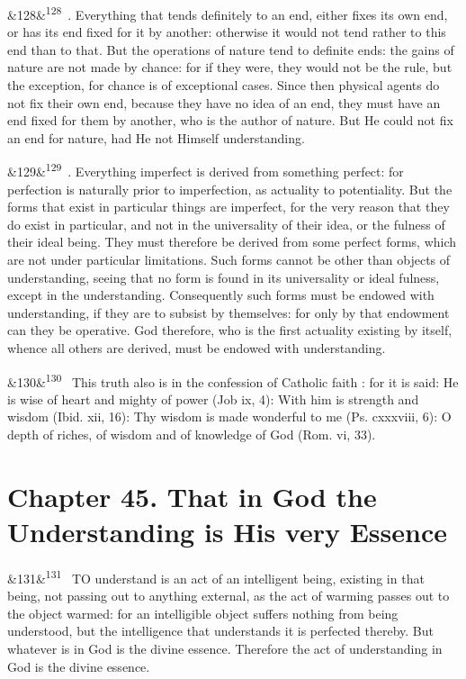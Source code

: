 \documentclass[12pt]{article}
\newcommand{\para}[1][]{\par\noindent\ifx&#1&\else\textsuperscript{\footnotesize #1}~\fi}
\begin{document}
\para[128] 6. Everything that tends definitely to an end, either fixes its own end, or has its end fixed for it by another: otherwise it would not tend rather to this end than to that. But the operations of nature tend to definite ends: the gains of nature are not made by chance: for if they were, they would not be the rule, but the exception, for chance is of exceptional cases. Since then physical agents do not fix their own end, because they have no idea of an end, they must have an end fixed for them by another, who is the author of nature. But He could not fix an end for nature, had He not Himself understanding.

\para[129] 7. Everything imperfect is derived from something perfect: for perfection is naturally prior to imperfection, as actuality to potentiality. But the forms that exist in particular things are imperfect, for the very reason that they do exist in particular, and not in the universality of their idea, or the fulness of their ideal being. They must therefore be derived from some perfect forms, which are not under particular limitations. Such forms cannot be other than objects of understanding, seeing that no form is found in its universality or ideal fulness, except in the understanding. Consequently such forms must be endowed with understanding, if they are to subsist by themselves: for only by that endowment can they be operative. God therefore, who is the first actuality existing by itself, whence all others are derived, must be endowed with understanding.

\para[130] This truth also is in the confession of Catholic faith : for it is said: He is wise of heart and mighty of power (Job ix, 4): With him is strength and wisdom (Ibid. xii, 16): Thy wisdom is made wonderful to me (Ps. cxxxviii, 6): O depth of riches, of wisdom and of knowledge of God (Rom. vi, 33).

\section*{Chapter 45. That in God the Understanding is His very Essence}

\para[131] TO understand is an act of an intelligent being, existing in that being, not passing out to anything external, as the act of warming passes out to the object warmed: for an intelligible object suffers nothing from being understood, but the intelligence that understands it is perfected thereby. But whatever is in God is the divine essence. Therefore the act of understanding in God is the divine essence.
\end{document}
